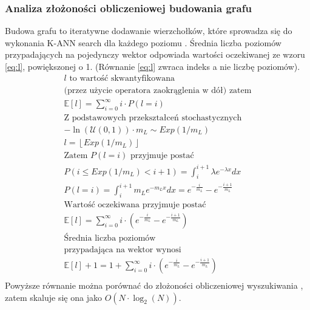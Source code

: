 \documentclass[twocolumn]{article}
\begin{document}
\subsubsection{Analiza złożoności obliczeniowej budowania grafu}
Budowa grafu to iteratywne dodawanie wierzchołków, które sprowadza się do wykonania K-ANN search dla każdego poziomu \cite{Malkov2016}. Średnia liczba poziomów przypadających na pojedynczy wektor odpowiada wartości oczekiwanej ze wzoru \ref{eq:l}, powiększonej o 1. (Równanie \ref{eq:l} zwraca indeks a nie liczbę poziomów).
\begin{multline}
\text{$l$ to wartość skwantyfikowana} \\ \text{(przez użycie operatora zaokrąglenia w dół) zatem} \\
\mathbb{E}[l] = \sum_{i=0}^{\infty}i \cdot P(l = i) \\
\text{Z podstawowych przekształceń stochastycznych} \\
-\ln\left(\mathcal{U}\left(0,1\right)\right)\cdot m_L \sim Exp(1/m_{L}) \\
l = \left\lfloor Exp(1/m_{L}) \right\rfloor \\
\text{Zatem $P(l = i)$ przyjmuje postać} \\
P(i \leq Exp(1/m_{L}) < i+1) = \int_i^{i+1} \lambda e^{-\lambda x}dx \\
P(l = i) = \int_i^{i+1} m_L e^{-m_L x}dx = e^{-\frac{i}{m_L}} - e^{-\frac{i+1}{m_L}} \\
\text{Wartość oczekiwana przyjmuje postać} \\
\mathbb{E}[l] = \sum_{i=0}^{\infty}i \cdot (e^{-\frac{i}{m_L}} - e^{-\frac{i+1}{m_L}}) \\
\text{Średnia liczba poziomów} \\ \text{przypadająca na wektor wynosi} \\
\mathbb{E}[l] + 1  = 1 + \sum_{i=0}^{\infty}i \cdot (e^{-\frac{i}{m_L}} - e^{-\frac{i+1}{m_L}}) \\
\end{multline}
Powyższe równanie można porównać do złożoności obliczeniowej wyszukiwania \cite{Malkov2016}, zatem skaluje się ona jako $O(N \cdot \log_2(N))$.    
\end{document}
